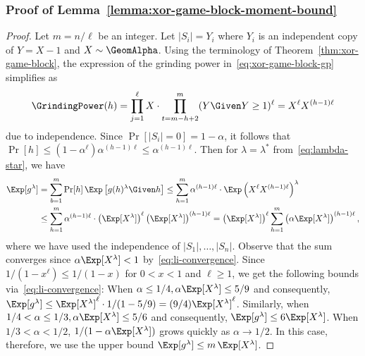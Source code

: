 \subsubsection*{Proof of Lemma~\ref{lemma:xor-game-block-moment-bound}}
\begin{proof}
Let $m = n/\ell$ be an integer.
Let $|S_i| = Y_i$ where $Y_i$ is an independent copy of $Y = X - 1$ and $X \sim \GeomAlpha$. 
Using the terminology of Theorem~\ref{thm:xor-game-block}, 
the expression of the grinding power in~\eqref{eq:xor-game-block-gp} simplifies as
\[
    \GrindingPower(h) = \prod_{j=1}^\ell{X} \cdot \prod_{t=m-h+2}^m(Y \Given Y \geq 1)^\ell = X^\ell X^{(h-1)\ell}
\]
due to independence.
Since $\Pr[|S_i| = 0] = 1-\alpha$, it follows that 
$\Pr[h] \leq (1 - \alpha^\ell)\alpha^{(h-1)\ell} \leq \alpha^{(h-1)\ell}$.
Then for $\lambda = \lambda^*$ from~\ref{eq:lambda-star}, we have
\begin{align*}
    \Exp[g^\lambda]
    &= \sum_{b = 1}^{m} {\Pr[h] \, 
        \Exp \left[ g(h)^\lambda \Given h\right]} 
    \leq  \sum_{h = 1}^{m} {  \alpha^{(h-1)\ell} \cdot \Exp \left(X^\ell X^{(h-1)\ell} \right)^\lambda } \\
    &\leq  \sum_{h = 1}^{m} {  \alpha^{(h-1)\ell} \cdot \left(\Exp[X^\lambda]\right)^\ell \left( \Exp[X^\lambda] \right)^{(h-1)\ell} } 
    = \left(\Exp[X^\lambda]\right)^\ell \sum_{h = 1}^{m} { \left(\alpha \Exp[X^\lambda]\right)^{(h-1)\ell} } \,,\\
\end{align*}
where we have used the independence of $|S_1|, \ldots, |S_n|$. 
Observe that the sum converges since $\alpha \Exp[X^\lambda] < 1$ by~\eqref{eq:li-convergence}. 
Since $1/(1-x^\ell) \leq 1/(1-x)$ for $0< x < 1$ and $\ell \geq 1$, 
we get the following bounds via~\eqref{eq:li-convergence}:
When $\alpha \leq 1/4, \alpha \Exp[X^\lambda] \leq 5/9$ and consequently, 
$\Exp[g^\lambda] \leq \Exp[X^\lambda]^\ell \cdot 1/(1-5/9) = (9/4) \Exp[X^\lambda]^\ell$. 
Similarly, when $1/4 < \alpha \leq 1/3, \alpha \Exp[X^\lambda] \leq 5/6$ and consequently,
$\Exp[g^\lambda] \leq 6 \Exp[X^\lambda]$. 
When $1/3 < \alpha < 1/2$, $1/(1-\alpha \Exp[X^\lambda])$ grows quickly as $\alpha \rightarrow 1/2$. 
In this case, therefore, we use the upper bound $\Exp[g^\lambda] \leq m\, \Exp[X^\lambda]$.
\end{proof}

